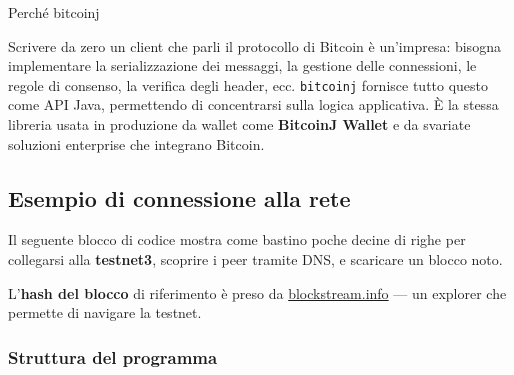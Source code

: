 \documentclass[
  italian,
  openany]{book}
\begin{document}
\begin{callouttip}{Perché bitcoinj}

Scrivere da zero un client che parli il protocollo di Bitcoin è
un'impresa: bisogna implementare la serializzazione dei messaggi, la
gestione delle connessioni, le regole di consenso, la verifica degli
header, ecc. \texttt{bitcoinj} fornisce tutto questo come API Java,
permettendo di concentrarsi sulla logica applicativa. È la stessa
libreria usata in produzione da wallet come \textbf{BitcoinJ Wallet} e
da svariate soluzioni enterprise che integrano Bitcoin.

\end{callouttip}

\subsection{Esempio di connessione alla
rete}\label{esempio-di-connessione-alla-rete}

Il seguente blocco di codice mostra come bastino poche decine di righe
per collegarsi alla \textbf{testnet3}, scoprire i peer tramite DNS, e
scaricare un blocco noto.

L'\textbf{hash del blocco} di riferimento è preso da
\href{https://blockstream.info/testnet/block/0000000000000adc6423b570d751efcdf5e019d3d955fee155c28925913cb667}{blockstream.info}
--- un explorer che permette di navigare la testnet.

\subsubsection{Struttura del programma}\label{struttura-del-programma}
\end{document}
